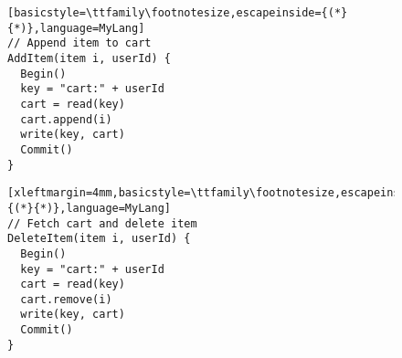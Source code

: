 \begin{figure}
  \centering
	\begin{minipage}{4.2cm}
		\begin{lstlisting}[basicstyle=\ttfamily\footnotesize,escapeinside={(*}{*)},language=MyLang]
// Append item to cart
AddItem(item i, userId) {
  Begin()
  key = "cart:" + userId
  cart = read(key)
  cart.append(i)
  write(key, cart)
  Commit()
}
		\end{lstlisting}
	\end{minipage}
	\hspace{-5mm}
	\begin{minipage}{4.2cm}
		\begin{lstlisting}[xleftmargin=4mm,basicstyle=\ttfamily\footnotesize,escapeinside={(*}{*)},language=MyLang]
// Fetch cart and delete item
DeleteItem(item i, userId) {
  Begin()
  key = "cart:" + userId
  cart = read(key)
  cart.remove(i)
  write(key, cart)
  Commit()
}
		\end{lstlisting}
	\end{minipage}
	

\end{figure}
